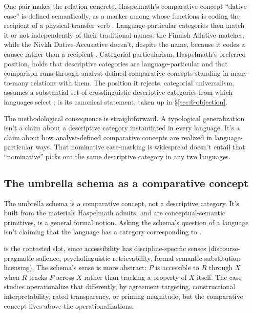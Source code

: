 One pair makes the relation concrete. Haspelmath's comparative concept \enquote{dative case} is defined semantically, as a marker among whose functions is coding the recipient of a physical-transfer verb \autocite[666]{haspelmath-2010-comparative-concepts}. Language-particular categories then match it or not independently of their traditional names: the Finnish Allative matches, while the Nivkh Dative-Accusative doesn't, despite the name, because it codes a causee rather than a recipient \autocite[665--666]{haspelmath-2010-comparative-concepts}. Categorial particularism, Haspelmath's preferred position, holds that descriptive categories are language-particular and that comparison runs through analyst-defined comparative concepts standing in many-to-many relations with them. The position it rejects, categorial universalism, assumes a substantial set of crosslinguistic descriptive categories from which languages select \autocite[663]{haspelmath-2010-comparative-concepts}; \textcite{newmeyer-2007-crosslinguistic-formal-categories} is its canonical statement, taken up in §\ref{sec:6-objection}.

The methodological consequence is straightforward. A typological generalization isn't a claim about a descriptive category instantiated in every language. It's a claim about how analyst-defined comparative concepts are realized in language-particular ways. That nominative case-marking is widespread doesn't entail that \enquote{nominative} picks out the same descriptive category in any two languages.

\subsection{The umbrella schema as a comparative concept}

The umbrella schema is a comparative concept, not a descriptive category. It's built from the materials Haspelmath \autocite*[665]{haspelmath-2010-comparative-concepts} admits:  and  are conceptual-semantic primitives,  is a general formal notion. Asking the schema's question of a language isn't claiming that the language has a category corresponding to .

 is the contested slot, since accessibility has discipline-specific senses (discourse-pragmatic salience, psycholinguistic retrievability, formal-semantic substitution-licensing). The schema's sense is more abstract: $P$ is accessible to $R$ through $X$ when $R$ tracks $P$ across $X$ rather than tracking a property of $X$ itself. The case studies operationalize that differently, by agreement targeting, constructional interpretability, rated transparency, or priming magnitude, but the comparative concept lives above the operationalizations.

